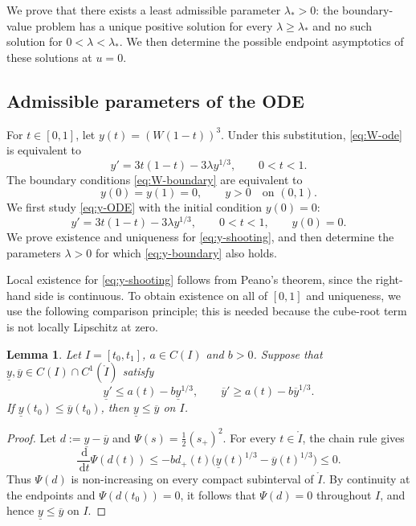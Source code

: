 \documentclass[12pt,preprint]{amsart}
\numberwithin{equation}{section}
\theoremstyle{plain}
\newtheorem{lemma}[theorem]{Lemma}
\theoremstyle{definition}
\newcommand{\dd}{\,\mathrm d}
\begin{document}
We prove that there exists a least admissible parameter $\lambda_*>0$: the
boundary-value problem has a unique positive solution for every
$\lambda\ge\lambda_*$ and no such solution for $0<\lambda<\lambda_*$.  We
then determine the possible endpoint asymptotics of these solutions at
$u=0$.

\subsection{Admissible parameters of the ODE}

For $t\in[0,1]$, let $y(t)=(W(1-t))^3$.  Under this substitution,
\eqref{eq:W-ode} is equivalent to
\begin{equation}
 y'=3t(1-t)-3\lambda y^{1/3}, \qquad 0<t<1.
 \label{eq:y-ODE}
\end{equation}
The boundary conditions \eqref{eq:W-boundary} are equivalent to
\begin{equation}
    \label{eq:y-boundary}
 y(0)=y(1)=0, \qquad y>0 \quad\text{on }(0,1).
\end{equation}
We first study \eqref{eq:y-ODE} with the initial condition $y(0)=0$:
\begin{equation}
 y'=3t(1-t)-3\lambda y^{1/3}, \qquad 0<t<1,\qquad y(0)=0.
 \label{eq:y-shooting}
\end{equation}
We prove existence and uniqueness for \eqref{eq:y-shooting}, and then
determine the parameters $\lambda>0$ for which \eqref{eq:y-boundary} also
holds.

Local existence for \eqref{eq:y-shooting} follows from Peano's theorem, since
the right-hand side is continuous.  To obtain existence on all of \([0,1]\) and
uniqueness, we use the following comparison principle; this is needed because
the cube-root term is not locally Lipschitz at zero.

\begin{lemma}
\label{lem:cuberoot-comparison}
Let \(I=[t_0,t_1]\), \(a\in C(I)\) and \(b>0\). Suppose that
\(\underline y,\overline y\in C(I)\cap C^1(\mathring{I})\) satisfy
\[
 \underline y'\le a(t)-b\underline y^{1/3},
 \qquad
 \overline y'\ge a(t)-b\overline y^{1/3}.
\]
If
\(\underline y(t_0)\le\overline y(t_0)\), then
\(\underline y\le\overline y\) on \(I\).
\end{lemma}

\begin{proof}
Let \(d:=\underline y-\overline y\) and
\(\Psi(s)=\frac12(s_+)^2\).  For every \(t\in\mathring I\), the chain
rule gives
\[
 \frac{\dd}{\dd t}\Psi(d(t))
 \le -b d_+(t)
 \bigl(\underline y(t)^{1/3}-\overline y(t)^{1/3}\bigr)
 \le 0.
\]
Thus \(\Psi(d)\) is non-increasing on every compact subinterval of
$\mathring I$.  By continuity at the endpoints and
\(\Psi(d(t_0))=0\), it follows that \(\Psi(d)=0\) throughout \(I\), and hence
\(\underline y\le\overline y\) on \(I\).
\end{proof}
\end{document}

